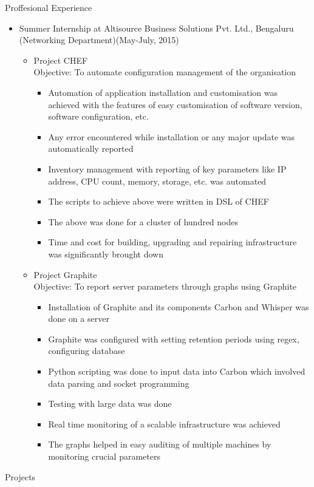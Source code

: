 \documentclass{article}
\begin{document}
\vspace{10pt}
{\Large Proffesional Experience}
\begin{itemize}
\item {\large Summer Internship at Altisource Business Solutions Pvt. Ltd., Bengaluru}\newline
(Networking Department)\hfill (May-July, 2015)
	\begin{itemize}
	\item Project CHEF\vspace{0.1cm}\\
	\vspace{0.1cm}
	Objective: To automate configuration management of the organisation
	\begin{itemize}
	\item Automation of application installation and customisation was achieved with the features of easy customisation of software version, software configuration, etc.
	\item Any error encountered while installation or any major update was automatically reported
	\item Inventory management with reporting  of key parameters like IP address, CPU count, memory, storage, etc. was automated
    \item The scripts to achieve above were written in DSL of CHEF 
	\item The above was done for a cluster of hundred nodes 
	\item Time and cost for building, upgrading and repairing infrastructure was significantly brought down 	\end{itemize}
	\vspace{0.6cm}
	\item Project Graphite\vspace{0.1cm}\\
	\vspace{0.1cm}
	Objective: To report server parameters through graphs using Graphite
	\begin{itemize}
	\item Installation of Graphite and its components Carbon and Whisper was done on a server
	\item Graphite was configured with setting retention periods using regex, configuring database
	\item Python scripting was done to input data into Carbon which involved data parsing and socket programming
	\item Testing with large data was done
	\item Real time monitoring of a scalable infrastructure was achieved
	\item The graphs helped in easy auditing of multiple machines by monitoring crucial parameters	\end{itemize}
	
	\end{itemize}
\end{itemize}
\vspace{100pt}
{\Large Projects}
\end{document}
